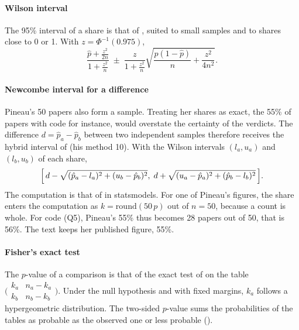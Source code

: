 \paragraph{Wilson interval}
The 95\% interval of a share is that of \textcite{wilson1927probable}, suited to small samples and to
shares close to 0 or 1. With $z = \Phi^{-1}(0.975)$,
\begin{equation}
  \frac{\hat{p} + \frac{z^2}{2n}}{1 + \frac{z^2}{n}}
  \;\pm\;
  \frac{z}{1 + \frac{z^2}{n}} \sqrt{\frac{\hat{p}(1 - \hat{p})}{n} + \frac{z^2}{4n^2}} .
\end{equation}

\paragraph{Newcombe interval for a difference}
Pineau's 50 papers also form a sample. Treating her shares as exact, the 55\% of papers with code for
instance, would overstate the certainty of the verdicts. The difference $d = \hat{p}_a - \hat{p}_b$ between
two independent samples therefore receives the hybrid interval of \textcite{newcombe1998interval} (his
method 10). With the Wilson intervals $(l_a, u_a)$ and $(l_b, u_b)$ of each share,
\begin{equation}
  \Bigl[\, d - \sqrt{(\hat{p}_a - l_a)^2 + (u_b - \hat{p}_b)^2} ,\;
  d + \sqrt{(u_a - \hat{p}_a)^2 + (\hat{p}_b - l_b)^2} \,\Bigr].
\end{equation}
The computation is that of  in statsmodels. For one
of Pineau's figures, the share enters the computation as $k = \mathrm{round}(50\,p)$ out of $n = 50$,
because a count is whole. For code (Q5), Pineau's 55\% thus becomes 28 papers out of 50, that is 56\%.
The text keeps her published figure, 55\%.

\paragraph{Fisher's exact test}
The $p$-value of a comparison is that of the exact test of \textcite{fisher1922interpretation} on the
table $\bigl(\begin{smallmatrix} k_a & n_a - k_a \\ k_b & n_b - k_b \end{smallmatrix}\bigr)$. Under the
null hypothesis and with fixed margins, $k_a$ follows a hypergeometric distribution. The two-sided
$p$-value sums the probabilities of the tables as probable as the observed one or less probable
().

